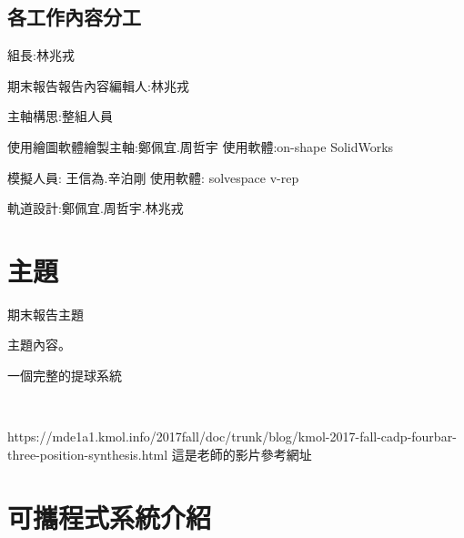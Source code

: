 \documentclass[12pt,,]{report}
\begin{document}
\begingroup
    \renewcommand{\contentsname}{\center 目錄 \addcontentsline{toc}{chapter}{目錄}}
    \renewcommand{\numberline}[1]{~#1\hspace*{1em}}
        \setcounter{tocdepth}{2}
    \tableofcontents
    \newcommand{\lotlabel}{表}
    \renewcommand{\listtablename}{\center 表目錄 \addcontentsline{toc}{chapter}{表目錄}}
    \renewcommand{\numberline}[1]{\lotlabel~#1\hspace*{1em}}
    \listoftables
    \newcommand{\loflabel}{圖}
    \renewcommand{\listfigurename}{\center 圖目錄 \addcontentsline{toc}{chapter}{圖目錄}}
    \renewcommand{\numberline}[1]{\loflabel~#1\hspace*{1em}}
    \listoffigures
\endgroup

\mainmatter
\hypertarget{ux5404ux5de5ux4f5cux5167ux5bb9ux5206ux5de5}{%
\section{各工作內容分工}\label{ux5404ux5de5ux4f5cux5167ux5bb9ux5206ux5de5}}

組長:林兆戎

期末報告報告內容編輯人:林兆戎

主軸構思:整組人員

使用繪圖軟體繪製主軸:鄭佩宜.周哲宇 使用軟體:on-shape SolidWorks

模擬人員: 王信為.辛泊剛 使用軟體: solvespace v-rep

軌道設計:鄭佩宜.周哲宇.林兆戎

\hypertarget{ux4e3bux984c}{%
\chapter{主題}\label{ux4e3bux984c}}

期末報告主題

主題內容。

一個完整的提球系統

~

https://mde1a1.kmol.info/2017fall/doc/trunk/blog/kmol-2017-fall-cadp-fourbar-three-position-synthesis.html
這是老師的影片參考網址

\hypertarget{ux53efux651cux7a0bux5f0fux7cfbux7d71ux4ecbux7d39}{%
\chapter{可攜程式系統介紹}\label{ux53efux651cux7a0bux5f0fux7cfbux7d71ux4ecbux7d39}}
\end{document}

